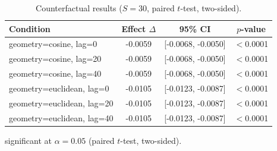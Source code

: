 \begin{table}[t]
  \centering
  \caption{Counterfactual results ($S=30$, paired $t$-test, two-sided).}
  \label{tab:counterfactual}
  \begin{tabular}{lccc}
    \toprule
    Condition & Effect $\Delta$ & 95\% CI & $p$-value \\
    \midrule
    geometry=cosine, lag=0 & -0.0059\dag{} & [-0.0068, -0.0050] & $<$0.0001 \\
    geometry=cosine, lag=20 & -0.0059\dag{} & [-0.0068, -0.0050] & $<$0.0001 \\
    geometry=cosine, lag=40 & -0.0059\dag{} & [-0.0068, -0.0050] & $<$0.0001 \\
    geometry=euclidean, lag=0 & -0.0105\dag{} & [-0.0123, -0.0087] & $<$0.0001 \\
    geometry=euclidean, lag=20 & -0.0105\dag{} & [-0.0123, -0.0087] & $<$0.0001 \\
    geometry=euclidean, lag=40 & -0.0105\dag{} & [-0.0123, -0.0087] & $<$0.0001 \\
    \bottomrule
  \end{tabular}
  \begin{minipage}{\linewidth}
    \vspace{4pt}
    \footnotesize \dag{} significant at $\alpha = 0.05$ (paired $t$-test, two-sided).
  \end{minipage}
\end{table}